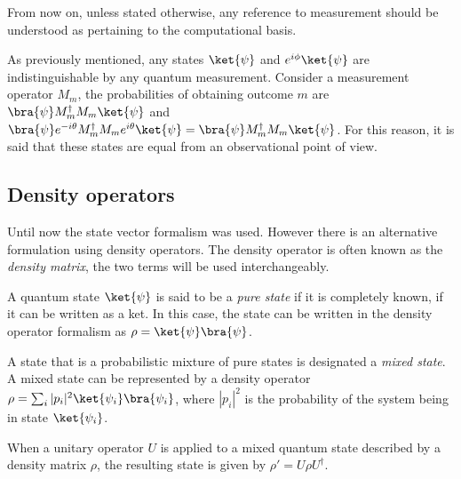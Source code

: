 From now on, unless stated otherwise, any reference to measurement should be understood as pertaining to the computational basis.

As previously mentioned, any states $\ket{\psi}$ and $e^{i\phi}\ket{\psi}$ are indistinguishable by any quantum measurement. Consider a measurement operator $M_m$, the probabilities of obtaining outcome $m$ are $\bra{\psi} M_{m}^{\dagger}M_{m}\ket{\psi}$ and $\bra{\psi} e^{-i \theta} M_{m}^{\dagger}M_{m}e^{i\theta}\ket{\psi}=\bra{\psi} M_{m}^{\dagger}M_{m}\ket{\psi}$. For this reason, it is said that these states are equal from an observational point of view.




\subsection{Density operators}
Until now the state vector formalism was used. However there is an alternative formulation using density operators. The density operator is often known as the \emph{density matrix}, the two terms will be used interchangeably.


\begin{definition}
A quantum state $\ket{\psi}$ is said to be a \emph{pure state} if it is completely known, \ie if it can be written as a ket. In this case, the state can be written in the density operator formalism as $\rho = \ket{\psi}\bra{\psi}$. 
\end{definition}

\begin{definition}
A state that is a probabilistic mixture of pure states is designated a \emph{mixed state}. A mixed state can be represented by a density operator $\rho= \sum_i |p_i|^{2}\ket{\psi_i}\bra{\psi_i}$, where $|p_i|^{2}$ is the probability of the system being in state $\ket{\psi_i}$.
\end{definition} 

\begin{definition}
  When a unitary operator \( U \) is applied to a mixed quantum state described by a density matrix \( \rho \), the resulting state is given by $ \rho' = U \rho U^\dagger.$
\end{definition}

